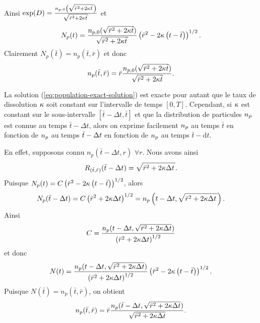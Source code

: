 Ainsi
$\exp(D) = \frac{n_{p,0}\left( \sqrt{\bar r^2 + 2\kappa \bar t\,} \right)}{\sqrt{\bar r^2 + 2\kappa \bar t\,}}$
et
\begin{equation*}
  N_p(t) = \frac{n_{p,0}(\sqrt{\bar r^2 + 2\kappa \bar
      t})}{\sqrt{\bar r^2 + 2\kappa \bar t\,}}\left( \bar r^2 -
    2\kappa \left( t - \bar t \right) \right)^{1/2}.
\end{equation*}
Clairement
$N_p(\bar t) = n_p(\bar t, \bar r)$
et donc
\begin{equation}\label{eq:population-exact-solution}
  n_p(\bar t, \bar r) = \bar r\frac{n_{p,0}(\sqrt{\bar r^2 +
      2\kappa \bar t})}{\sqrt{\bar r^2+2\kappa \bar t}}.
\end{equation}

\begin{remarque}\label{rem:population-exact-step}
  La solution (\ref{eq:population-exact-solution}) est exacte pour
  autant que le taux de dissolution $\kappa$ soit constant
  sur l'intervalle de temps $[0, T]$. Cependant, si $\kappa$
  est constant sur le sous-intervalle $[\bar t - \Delta t, \bar t]$ et
  que la distribution de particules $n_p$ est connue au temps
  $\bar t - \Delta t$, alors on exprime facilement $n_p$ au
  temps $\bar t$ en fonction de $n_p$ au temps $\bar t - \Delta t$
  en fonction de $n_p$ au temps $\bar t - \mathrm dt$.

  En effet, supposons connu $n_p(\bar t - \Delta t, r)$ $\forall
  r$. Nous avons ainsi
  \begin{equation*}
    R_{(\bar t, \bar r)}(\bar t - \Delta t) = \sqrt{\bar r^2 +
      2\kappa \Delta t\,}.
  \end{equation*}
  Puisque $N_p(t) = C\left( \bar r^2 - 2\kappa\left( t -
      \bar t \right) \right)^{1/2}$, alors
  \begin{equation*}
N_p(\bar t - \Delta t) = C\left( \bar r^2 + 2\kappa \Delta
  t \right)^{1/2} = n_p\left( t - \Delta t, \sqrt{\bar r^2 + 2\kappa
    \Delta t\,} \right).
  \end{equation*}
  Ainsi
  \begin{equation*}
    C = \frac{n_p(t - \Delta t, \sqrt{\bar r^2 + 2\kappa
        \Delta t})}{\left( \bar r^2 + 2\kappa\Delta t \right)^{1/2}}
  \end{equation*}
  et donc
  \begin{equation*}
    N(t) = \frac{n_p(t - \Delta t, \sqrt{\bar r^2 + 2\kappa
        \Delta t})}{\left( \bar r^2 + 2\kappa\Delta t \right)^{1/2}}\left( \bar
      r^2 - 2\kappa\left( t - \bar t \right) \right)^{1/2}.
  \end{equation*}
  Puisque $N(\bar t) = n_p(\bar t, \bar r)$, on obtient
  \begin{equation*}
    n_p(\bar t, \bar r) = \bar r\frac{n_p(\bar t - \Delta t, \sqrt{\bar
        r^2 + 2\kappa \Delta t})}{\sqrt{\bar r^2 +
        2\kappa \Delta t}}.
  \end{equation*}
\end{remarque}

